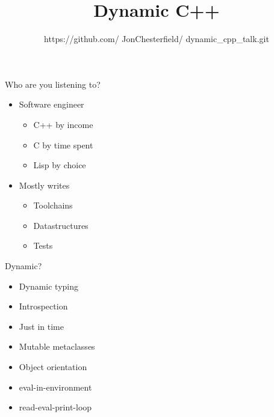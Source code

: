 \documentclass[20pt]{beamer}
\title[]{Dynamic C++}
\author[Jon]{https://github.com/
  JonChesterfield/
  dynamic\_cpp\_talk.git}
\begin{document}
\begin{frame}
  \titlepage
\end{frame}

\begin{frame}{Who are you listening to?}
  \begin{itemize}
  \item Software engineer
    \begin{itemize}
    \item C++ by income
    \item C by time spent
    \item Lisp by choice
    \end{itemize}
  \item Mostly writes
    \begin{itemize}
    \item Toolchains
    \item Datastructures
    \item Tests
    \end{itemize}
  \end{itemize}
\end{frame}

{
  \begin{frame}[plain]
  \end{frame}
}

\begin{frame}{Dynamic?}
  \begin{itemize}
  \item Dynamic typing
  \item Introspection
  \item Just in time
  \item Mutable metaclasses
  \item Object orientation
  \item eval-in-environment
  \item read-eval-print-loop
  \end{itemize}
\end{frame}
\end{document}
